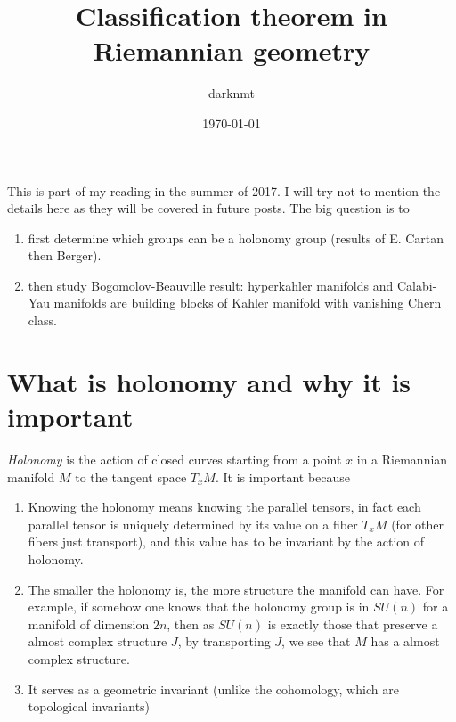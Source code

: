 \documentclass[11pt]{article}
\author{darknmt}
\date{\today}
\title{Classification theorem in Riemannian geometry}
\begin{document}
\maketitle
\tableofcontents

\iffalse
\begin{info}
The PDF version of this page can be downloaded by replacing \texttt{html} in the its address by
\texttt{pdf}. 
For example \texttt{/html/sheaf-cohomology.html} should become \texttt{/pdf/sheaf-cohomology.pdf}.
\end{info}
\fi

\iffalse
\begin{info}
This post is a part of the \href{../res/Stage2017.pdf}{memoire of my M1 internship} at I2M. The memoire contains,
needless to say, less errors than this page.
\end{info}
\fi




This is part of my reading in the summer of 2017. I will try not to mention the details here as they
will be covered in future posts. The big question is to 
\begin{enumerate}
\item first determine which groups can be a holonomy group (results of E. Cartan then Berger).
\item then study Bogomolov-Beauville result: hyperkahler manifolds and Calabi-Yau manifolds are
building blocks of Kahler manifold with vanishing Chern class.
\end{enumerate}

\section{What is holonomy and why it is important}
\label{sec:org5b05145}

\emph{Holonomy} is the action of closed curves starting from a point \(x\) in a Riemannian manifold \(M\) to
the tangent space \(T_xM\). It is important because

\begin{enumerate}
\item Knowing the holonomy means knowing the parallel tensors, in fact each parallel tensor is uniquely
determined by its value on a fiber \(T_xM\) (for other fibers just transport), and this value has
to be invariant by the action of holonomy.
\item The smaller the holonomy is, the more structure the manifold can have. For example, if somehow
one knows that the holonomy group is in \(SU(n)\) for a manifold of dimension \(2n\), then as \(SU(n)\)
is exactly those that preserve a almost complex structure \(J\), by transporting \(J\), we see that
\(M\) has a almost complex structure.
\item It serves as a geometric invariant (unlike the cohomology, which are topological invariants)
\end{enumerate}
\end{document}
